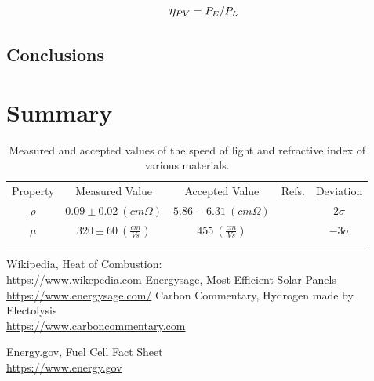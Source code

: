 \documentclass[aps,prl,reprint]{revtex4-2}
\begin{document}
\newpage
\begin{equation}
    \mathlarger{\eta_{PV}}=P_E/P_L
    \label{eta_PV}
\end{equation}

\subsection{Conclusions}

\section{Summary}

\begin{widetext}
\begin{center}
\begin{table}[h]
\renewcommand{\arraystretch}{1.35}
\setlength{\tabcolsep}{10pt}
\caption{\label{}Measured and accepted values of the speed of light and refractive index of various materials.}
\begin{tabular}{|c|c|c|c|c|}
\toprule
Property & Measured Value &  Accepted Value & Refs. &   Deviation \\
\colrule
$\rho$ &    $0.09 \pm 0.02\  (cm\Omega)$ &  $5.86-6.31\ (cm\Omega)$ &  \cite{resistivity} &   $2\sigma$ \\
\colrule
$\mu$ &  $320 \pm 60\  (\frac{cm}{Vs})$ &      $455\ (\frac{cm}{Vs})$ &  \cite{resistivity} &  $-3\sigma$ \\
\botrule
\end{tabular}
\end{table}
\end{center}
\end{widetext}


\begin{thebibliography}{9}
%
Wikipedia, Heat of Combustion: \\
\href{https://en.wikipedia.org/wiki/Heat_of_combustion}{https://www.wikepedia.com}
%
Energysage, Most Efficient Solar Panels\\
\href{https://news.energysage.com/what-are-the-most-efficient-solar-panels-on-the-market/#:~:text=How%20efficient%20are%20solar%20panels,are%20not%20above%2020%25%20efficiency.}{https://www.energysage.com/}
%
Carbon Commentary, Hydrogen made by Electolysis\\
\href{https://www.carboncommentary.com/blog/2017/7/5/hydrogen-made-by-the-electrolysis-of-water-is-now-cost-competitive-and-gives-us-another-building-block-for-the-low-carbon-economy}{https://www.carboncommentary.com}
%

%
Energy.gov, Fuel Cell Fact Sheet\\
\href{https://www.energy.gov/sites/prod/files/2015/11/f27/fcto_fuel_cells_fact_sheet.pdf}{https://www.energy.gov}

\end{thebibliography}
\end{document}
